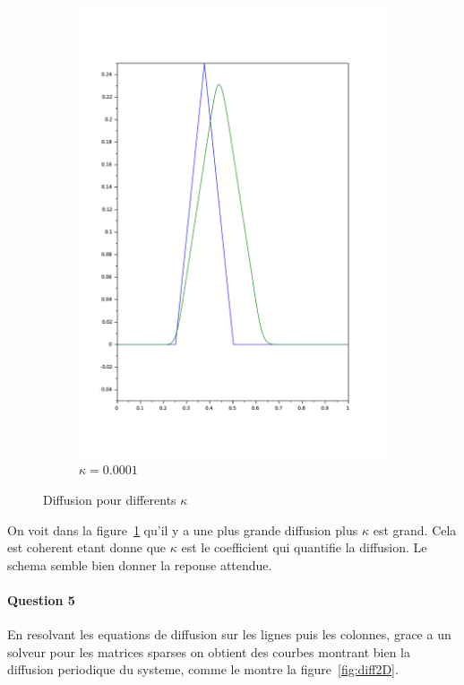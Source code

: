 \documentclass{article}
\begin{document}
\begin{figure}
\begin{subfigure}[b]{0.3\textwidth}
		\includegraphics[width=\textwidth]{conv_kappa_0,0001.pdf}
		\caption{$\kappa=0.0001$}
	\end{subfigure}
	\caption{Diffusion pour differents $\kappa$}\label{fig:diff1D}
\end{figure}

On voit dans la figure~\ref{fig:diff1D} qu'il y a une plus grande diffusion plus $\kappa$ est grand. Cela est coherent etant donne que $\kappa$ est le coefficient qui quantifie la diffusion. Le schema semble bien donner la reponse attendue.

\paragraph{Question 5}

En resolvant les equations de diffusion sur les lignes puis les colonnes, grace a un solveur pour les matrices sparses on obtient des courbes montrant bien la diffusion periodique du systeme, comme le montre la figure~\ref{fig:diff2D}.
\end{document}
